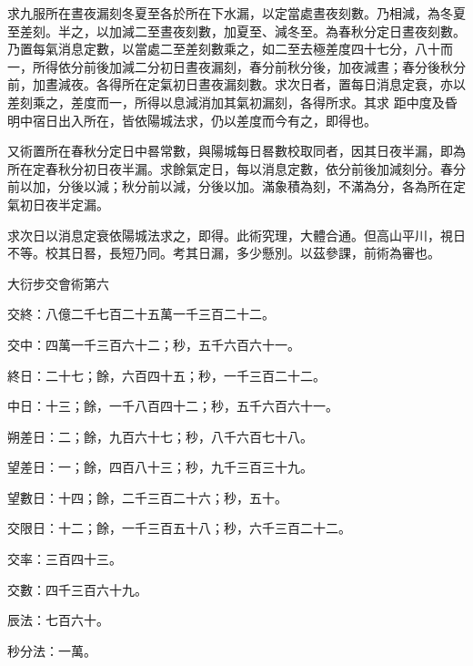 \begin{pinyinscope}
 求九服所在晝夜漏刻冬夏至各於所在下水漏，以定當處晝夜刻數。乃相減，為冬夏至差刻。半之，以加減二至晝夜刻數，加夏至、減冬至。為春秋分定日晝夜刻數。乃置每氣消息定數，以當處二至差刻數乘之，如二至去極差度四十七分，八十而一，所得依分前後加減二分初日晝夜漏刻，春分前秋分後，加夜減晝；春分後秋分前，加晝減夜。各得所在定氣初日晝夜漏刻數。求次日者，置每日消息定衰，亦以差刻乘之，差度而一，所得以息減消加其氣初漏刻，各得所求。其求
 距中度及昏明中宿日出入所在，皆依陽城法求，仍以差度而今有之，即得也。



 又術置所在春秋分定日中晷常數，與陽城每日晷數校取同者，因其日夜半漏，即為所在定春秋分初日夜半漏。求餘氣定日，每以消息定數，依分前後加減刻分。春分前以加，分後以減；秋分前以減，分後以加。滿象積為刻，不滿為分，各為所在定氣初日夜半定漏。



 求次日以消息定衰依陽城法求之，即得。此術究理，大體合通。但高山平川，視日不等。校其日晷，長短乃同。考其日漏，多少懸別。以茲參課，前術為審也。



 大衍步交會術第六



 交終：八億二千七百二十五萬一千三百二十二。



 交中：四萬一千三百六十二；秒，五千六百六十一。



 終日：二十七；餘，六百四十五；秒，一千三百二十二。



 中日：十三；餘，一千八百四十二；秒，五千六百六十一。



 朔差日：二；餘，九百六十七；秒，八千六百七十八。



 望差日：一；餘，四百八十三；秒，九千三百三十九。



 望數日：十四；餘，二千三百二十六；秒，五十。



 交限日：十二；餘，一千三百五十八；秒，六千三百二十二。



 交率：三百四十三。



 交數：四千三百六十九。



 辰法：七百六十。



 秒分法：一萬。




\end{pinyinscope}
